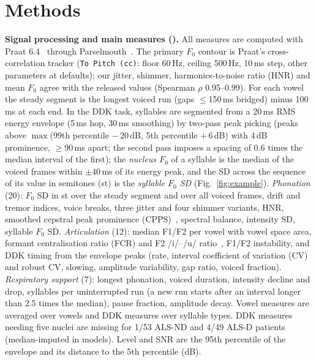 \documentclass{article}
\begin{document}
\section{Methods}
\label{sec:methods}
\textbf{Signal processing and main measures (\nFeat).} All measures are computed with Praat 6.4~\cite{boersma2021praat} through Parselmouth~\cite{jadoul2018parselmouth}. The primary $F_0$ contour is Praat's cross-correlation tracker (\texttt{To Pitch (cc)}: floor 60\,Hz, ceiling 500\,Hz, 10\,ms step, other parameters at defaults); our jitter, shimmer, harmonics-to-noise ratio (HNR) and mean $F_0$ agree with the released values (Spearman $\rho$ 0.95--0.99). For each vowel the steady segment is the longest voiced run (gaps $\le$150\,ms bridged) minus 100\,ms at each end. In the DDK task, syllables are segmented from a 20\,ms RMS energy envelope (5\,ms hop, 30\,ms smoothing) by two-pass peak picking (peaks above $\max$(99th percentile $-$\,20\,dB, 5th percentile $+$\,6\,dB) with 4\,dB prominence, $\geq$90\,ms apart; the second pass imposes a spacing of 0.6 times the median interval of the first); the \emph{nucleus $F_0$} of a syllable is the median of the voiced frames within $\pm$40\,ms of its energy peak, and the SD across the sequence of its value in semitones (st) is the \emph{syllable $F_0$ SD} (Fig.~\ref{fig:example}). \emph{Phonation} (20): $F_0$ SD in st over the steady segment and over all voiced frames, drift and tremor indices, voice breaks, three jitter and four shimmer variants, HNR, smoothed cepstral peak prominence (CPPS)~\cite{maryn2010cpps}, spectral balance, intensity SD, syllable $F_0$ SD. \emph{Articulation} (12): median F1/F2 per vowel with vowel space area, formant centralisation ratio (FCR) and F2 /i/--/u/ ratio~\cite{sapir2010fcr}, F1/F2 instability, and DDK timing from the envelope peaks (rate, interval coefficient of variation (CV) and robust CV, slowing, amplitude variability, gap ratio, voiced fraction). \emph{Respiratory support} (7): longest phonation, voiced duration, intensity decline and drop, syllables per uninterrupted run (a new run starts after an interval longer than 2.5 times the median), pause fraction, amplitude decay. Vowel measures are averaged over vowels and DDK measures over syllable types. DDK measures needing five nuclei are missing for 1/53 ALS-ND and 4/49 ALS-D patients (median-imputed in models). Level and SNR are the 95th percentile of the envelope and its distance to the 5th percentile (dB).
\end{document}
